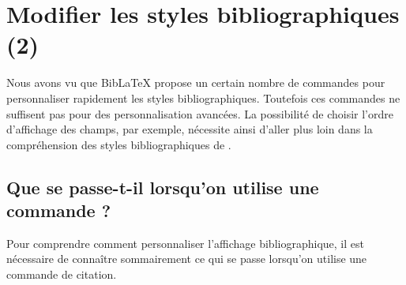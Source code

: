 \chapter{Modifier les styles bibliographiques (2)}\label{style2}


\begin{intro}
    Nous avons vu que BibLaTeX propose un certain nombre de commandes pour personnaliser rapidement les styles bibliographiques. Toutefois  ces commandes ne suffisent pas pour des personnalisation avancées. 
    La possibilité de choisir l'ordre d'affichage des champs, par exemple, nécessite ainsi d'aller plus loin dans la compréhension des styles bibliographiques de .
\end{intro}


\section[Que se passe-t-il lorsqu'on utilise \texorpdfstring{\oldcs{\meta{prefix}cite}}{\textbackslash <prefix>cite}]{Que se passe-t-il lorsqu'on utilise une commande  ?}

Pour comprendre comment personnaliser l'affichage bibliographique, il est nécessaire de connaître sommairement ce qui se passe lorsqu'on utilise une commande de citation. 


